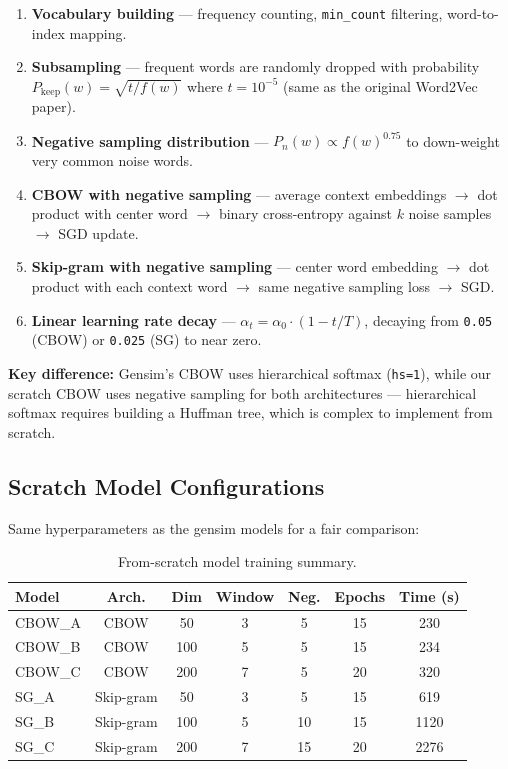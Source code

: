 \documentclass[11pt,a4paper]{article}
\begin{document}
\begin{enumerate}[leftmargin=2em, label=\arabic*.]
  \item \textbf{Vocabulary building} --- frequency counting, \texttt{min\_count} filtering, word-to-index mapping.
  \item \textbf{Subsampling} --- frequent words are randomly dropped with probability $P_{\text{keep}}(w) = \sqrt{t / f(w)}$ where $t = 10^{-5}$ (same as the original Word2Vec paper).
  \item \textbf{Negative sampling distribution} --- $P_n(w) \propto f(w)^{0.75}$ to down-weight very common noise words.
  \item \textbf{CBOW with negative sampling} --- average context embeddings $\to$ dot product with center word $\to$ binary cross-entropy against $k$ noise samples $\to$ SGD update.
  \item \textbf{Skip-gram with negative sampling} --- center word embedding $\to$ dot product with each context word $\to$ same negative sampling loss $\to$ SGD.
  \item \textbf{Linear learning rate decay} --- $\alpha_t = \alpha_0 \cdot (1 - t/T)$, decaying from \texttt{0.05} (CBOW) or \texttt{0.025} (SG) to near zero.
\end{enumerate}

\begin{notebox}
\textbf{Key difference:} Gensim's CBOW uses hierarchical softmax (\texttt{hs=1}), while our scratch CBOW uses negative sampling for both architectures --- hierarchical softmax requires building a Huffman tree, which is complex to implement from scratch.
\end{notebox}

\subsection{Scratch Model Configurations}

Same hyperparameters as the gensim models for a fair comparison:

\begin{table}[H]
\centering
\caption{From-scratch model training summary.}
\renewcommand{\arraystretch}{1.3}
\begin{tabularx}{\textwidth}{lcccccc}
\toprule
\textbf{Model} & \textbf{Arch.} & \textbf{Dim} & \textbf{Window} & \textbf{Neg.} & \textbf{Epochs} & \textbf{Time (s)} \\
\midrule
CBOW\_A & CBOW      & 50  & 3 & 5  & 15 & 230 \\
CBOW\_B & CBOW      & 100 & 5 & 5  & 15 & 234 \\
CBOW\_C & CBOW      & 200 & 7 & 5  & 20 & 320 \\
SG\_A   & Skip-gram & 50  & 3 & 5  & 15 & 619 \\
SG\_B   & Skip-gram & 100 & 5 & 10 & 15 & 1120 \\
SG\_C   & Skip-gram & 200 & 7 & 15 & 20 & 2276 \\
\bottomrule
\end{tabularx}
\label{tab:scratch_configs}
\end{table}
\end{document}

